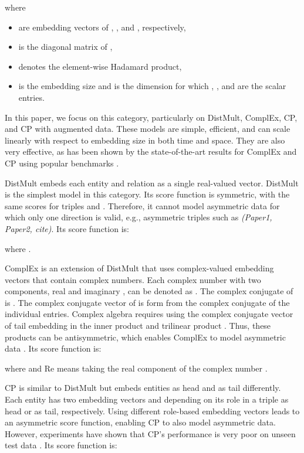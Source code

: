 \documentclass[sigconf,edbt]{acmart-edbt2019}
\begin{document}
where 
\begin{itemize}
	\item  are embedding vectors of , , and , respectively,
	\item  is the diagonal matrix of ,
	\item  denotes the element-wise Hadamard product,
	\item  is the embedding size and  is the dimension for which , , and  are the scalar entries.
\end{itemize}

In this paper, we focus on this category, particularly on DistMult, ComplEx, CP, and CP with augmented data. These models are simple, efficient, and can scale linearly with respect to embedding size in both time and space. They are also very effective, as has been shown by the state-of-the-art results for ComplEx and CP using popular benchmarks \cite{trouillon_complexembeddingssimple_2016} \cite{lacroix_canonicaltensordecomposition_2018}.

DistMult \cite{yang_embeddingentitiesrelations_2015} embeds each entity and relation as a single real-valued vector. DistMult is the simplest model in this category. Its score function is symmetric, with the same scores for triples  and . Therefore, it cannot model asymmetric data for which only one direction is valid, e.g., asymmetric triples such as \textit{(Paper1, Paper2, cite)}. Its score function is:

where .

ComplEx \cite{trouillon_complexembeddingssimple_2016} is an extension of DistMult that uses complex-valued embedding vectors that contain complex numbers. Each complex number  with two components, real  and imaginary , can be denoted as . The complex conjugate  of  is . The complex conjugate vector  of  is form from the complex conjugate of the individual entries. Complex algebra requires using the complex conjugate vector of tail embedding in the inner product and trilinear product \cite{ahlfors_complexanalysisintroduction_1953}. Thus, these products can be antisymmetric, which enables ComplEx to model asymmetric data \cite{trouillon_complexembeddingssimple_2016} \cite{trouillon_knowledgegraphcompletion_2017}. Its score function is:

where  and Re means taking the real component of the complex number .

CP \cite{hitchcock_expressiontensorpolyadic_1927} is similar to DistMult but embeds entities as head and as tail differently. Each entity  has two embedding vectors  and  depending on its role in a triple as head or as tail, respectively. Using different role-based embedding vectors leads to an asymmetric score function, enabling CP to also model asymmetric data. However, experiments have shown that CP's performance is very poor on unseen test data \cite{lacroix_canonicaltensordecomposition_2018}. Its score function is:
\end{document}
